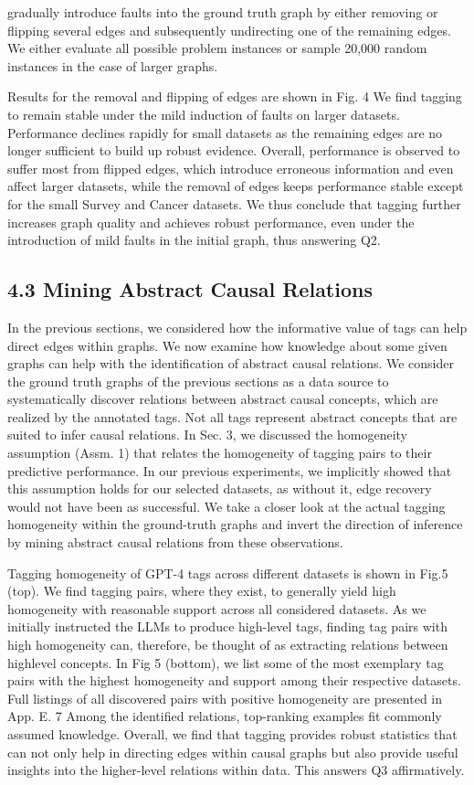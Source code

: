 \documentclass[10pt]{article}
\begin{document}
gradually introduce faults into the ground truth graph by either removing or flipping several edges and subsequently undirecting one of the remaining edges. We either evaluate all possible problem instances or sample 20,000 random instances in the case of larger graphs.

Results for the removal and flipping of edges are shown in Fig. 4 We find tagging to remain stable under the mild induction of faults on larger datasets. Performance declines rapidly for small datasets as the remaining edges are no longer sufficient to build up robust evidence. Overall, performance is observed to suffer most from flipped edges, which introduce erroneous information and even affect larger datasets, while the removal of edges keeps performance stable except for the small Survey and Cancer datasets. We thus conclude that tagging further increases graph quality and achieves robust performance, even under the introduction of mild faults in the initial graph, thus answering Q2.

\subsection*{4.3 Mining Abstract Causal Relations}
In the previous sections, we considered how the informative value of tags can help direct edges within graphs. We now examine how knowledge about some given graphs can help with the identification of abstract causal relations. We consider the ground truth graphs of the previous sections as a data source to systematically discover relations between abstract causal concepts, which are realized by the annotated tags. Not all tags represent abstract concepts that are suited to infer causal relations. In Sec. 3, we discussed the homogeneity assumption (Assm. 1) that relates the homogeneity of tagging pairs to their predictive performance. In our previous experiments, we implicitly showed that this assumption holds for our selected datasets, as without it, edge recovery would not have been as successful. We take a closer look at the actual tagging homogeneity within the ground-truth graphs and invert the direction of inference by mining abstract causal relations from these observations.

Tagging homogeneity of GPT-4 tags across different datasets is shown in Fig.5 (top). We find tagging pairs, where they exist, to generally yield high homogeneity with reasonable support across all considered datasets. As we initially instructed the LLMs to produce high-level tags, finding tag pairs with high homogeneity can, therefore, be thought of as extracting relations between highlevel concepts. In Fig 5 (bottom), we list some of the most exemplary tag pairs with the highest homogeneity and support among their respective datasets. Full listings of all discovered pairs with positive homogeneity are presented in App. E. 7 Among the identified relations, top-ranking examples fit commonly assumed knowledge. Overall, we find that tagging provides robust statistics that can not only help in directing edges within causal graphs but also provide useful insights into the higher-level relations within data. This answers Q3 affirmatively.
\end{document}

